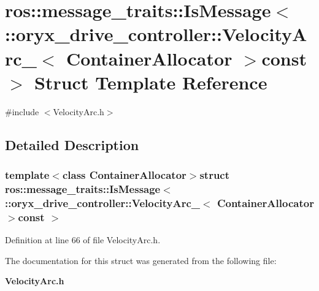 \section{ros\-:\-:message\-\_\-traits\-:\-:\-Is\-Message$<$ \-:\-:oryx\-\_\-drive\-\_\-controller\-:\-:\-Velocity\-Arc\-\_\-$<$ \-Container\-Allocator $>$const $>$ \-Struct \-Template \-Reference}
\label{structros_1_1message__traits_1_1IsMessage_3_01_1_1oryx__drive__controller_1_1VelocityArc___3_01Cfed6089a77ea2bfe6a4f686837dfaa76}


{\ttfamily \#include $<$\-Velocity\-Arc.\-h$>$}



\subsection{\-Detailed \-Description}
\subsubsection*{template$<$class Container\-Allocator$>$struct ros\-::message\-\_\-traits\-::\-Is\-Message$<$ \-::oryx\-\_\-drive\-\_\-controller\-::\-Velocity\-Arc\-\_\-$<$ Container\-Allocator $>$const  $>$}



\-Definition at line 66 of file \-Velocity\-Arc.\-h.



\-The documentation for this struct was generated from the following file\-:\begin{DoxyCompactItemize}
\item 
{\bf \-Velocity\-Arc.\-h}\end{DoxyCompactItemize}
